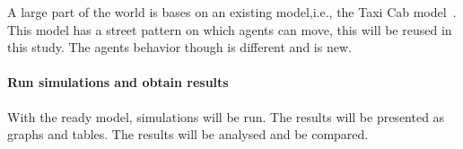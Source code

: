 A large part of the world is bases on an existing model,i.e., the Taxi Cab model~\cite{dongpingtaxicabs2019}.
This model has a street pattern on which agents can move, this will be reused in this study.
The agents behavior though is different and is new.


\paragraph{Run simulations and obtain results}
With the ready model, simulations will be run.
The results will be presented as graphs and tables.
The results will be analysed and be compared.







